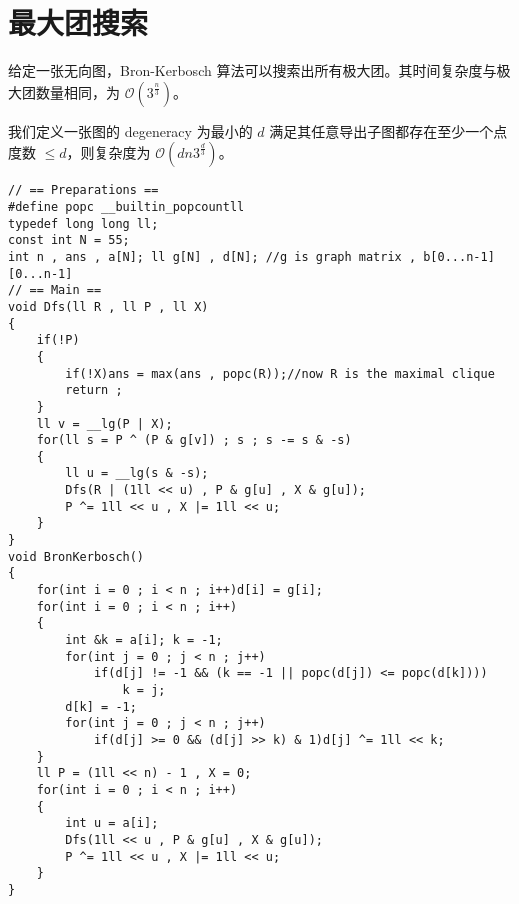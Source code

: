 \section{最大团搜索}

给定一张无向图，Bron-Kerbosch 算法可以搜索出所有极大团。其时间复杂度与极大团数量相同，为 $\mathcal{O}(3^{\frac{n}{3}})$。

我们定义一张图的 degeneracy 为最小的 $d$ 满足其任意导出子图都存在至少一个点度数 $\le d$，则复杂度为 $\mathcal{O}(dn3^{\frac{d}{3}})$。

\begin{verbatim}
// == Preparations ==
#define popc __builtin_popcountll 
typedef long long ll;
const int N = 55;
int n , ans , a[N]; ll g[N] , d[N]; //g is graph matrix , b[0...n-1][0...n-1]
// == Main ==
void Dfs(ll R , ll P , ll X)
{
    if(!P)
    {
        if(!X)ans = max(ans , popc(R));//now R is the maximal clique
        return ;
    }
    ll v = __lg(P | X);
    for(ll s = P ^ (P & g[v]) ; s ; s -= s & -s)
    {
        ll u = __lg(s & -s);
        Dfs(R | (1ll << u) , P & g[u] , X & g[u]);
        P ^= 1ll << u , X |= 1ll << u;
    }
}
void BronKerbosch()
{
    for(int i = 0 ; i < n ; i++)d[i] = g[i];
    for(int i = 0 ; i < n ; i++)
    {
        int &k = a[i]; k = -1;
        for(int j = 0 ; j < n ; j++)
            if(d[j] != -1 && (k == -1 || popc(d[j]) <= popc(d[k])))
                k = j;
        d[k] = -1;
        for(int j = 0 ; j < n ; j++)
            if(d[j] >= 0 && (d[j] >> k) & 1)d[j] ^= 1ll << k;
    }
    ll P = (1ll << n) - 1 , X = 0;
    for(int i = 0 ; i < n ; i++)
    {
        int u = a[i];
        Dfs(1ll << u , P & g[u] , X & g[u]);
        P ^= 1ll << u , X |= 1ll << u;
    }
}
\end{verbatim}